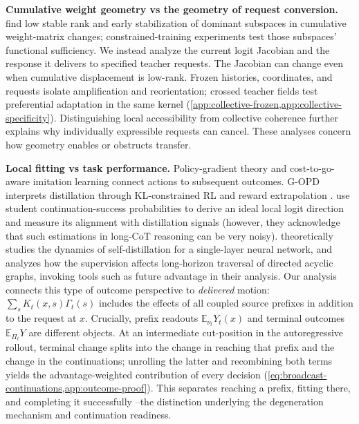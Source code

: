 \noindent\textbf{Cumulative weight geometry vs the geometry of request conversion.}
\citet{shen2026geometryonpolicydistillation} find low stable rank and early stabilization of dominant subspaces in cumulative weight-matrix changes; constrained-training experiments test those subspaces' functional sufficiency. We instead analyze the current logit Jacobian and the response it delivers to specified teacher requests. The Jacobian can change even when cumulative displacement is low-rank. Frozen histories, coordinates, and requests isolate amplification and reorientation; crossed teacher fields test preferential adaptation in the same kernel (\cref{app:collective-frozen,app:collective-specificity}). Distinguishing local accessibility from collective coherence further explains why individually expressible requests can cancel. These analyses concern how geometry enables or obstructs transfer.

\noindent\textbf{Local fitting vs task performance.}
Policy-gradient theory \citep{sutton2000policy} and cost-to-go-aware imitation learning \citep{ross2014reinforcementimitationlearninginteractive} connect actions to subsequent outcomes. G-OPD interprets distillation through KL-constrained RL and reward extrapolation \citep{yang2026gopd}. \citet{armandpour2026unmaskingonpolicydistillationhelps} use student continuation-success probabilities to derive an ideal local logit direction and measure its alignment with distillation signals (however, they acknowledge that such estimations in long-CoT reasoning can be very noisy). \cite{uemura2026learningoverwritingtheoryselfdistillation} theoretically studies the dynamics of self-distillation for a single-layer neural network, and analyzes how the supervision affects long-horizon traversal of directed acyclic graphs, invoking tools such as future advantage in their analysis. Our analysis connects this type of outcome perspective to \emph{delivered} motion: $\sum_s K_t(x,s)\Gamma_t(s)$ includes the effects of all coupled source prefixes in addition to the request at $x$. Crucially, prefix readouts $\mathbb{E}_{\nu_t}Y_t(x)$ and terminal outcomes $\mathbb{E}_{\Pi_t}Y$ are different objects. At an intermediate cut-position in the autoregressive rollout, terminal change splits into the change in reaching that prefix and the change in the continuations; unrolling the latter and recombining both terms yields the advantage-weighted contribution of every decision (\cref{eq:broadcast-continuations,app:outcome-proof}). This separates reaching a prefix, fitting there, and completing it successfully --the distinction underlying the degeneration mechanism and continuation readiness.

